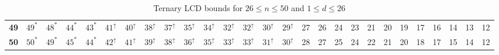 \begin{landscape}
{\begin{table}
\begin{tabular}{|c| c c c c c c c c c c c c c c c c c c c c c c c c c c |}
\textbf{49} & $49^*$ & $48^*$ & $44^*$ & $43^*$ & $41^\uparrow$ & $40^\uparrow$ & $38^\uparrow$ & $37^\uparrow$ & $35^\uparrow$ & $34^\uparrow$ & $32^\uparrow$ & $32^\uparrow$ & $30^\uparrow$ & $29^\uparrow$ & 27 & 26 & 24 & 23 & 21 & 20 & 19 & 17 & 16 & 14 & 13 & 12 \\
\textbf{50} & $50^*$ & $49^*$ & $45^*$ & $44^*$ & $42^\uparrow$ & $41^\uparrow$ & $39^\uparrow$ & $38^\uparrow$ & $36^\uparrow$ & $35^\uparrow$ & $33^\uparrow$ & $33^\uparrow$ & $31^\uparrow$ & $30^\uparrow$ & 28 & 27 & 25 & 24 & 22 & 21 & 20 & 18 & 17 & 15 & 14 & 12 \\
\hline
\end{tabular}
\caption{Ternary LCD bounds for $26 \leq n \leq 50$ and $1 \leq d \leq 26$}
\label{tab:lp_tables_q3_26_50_1_26}
\end{table} 
}
\end{landscape}